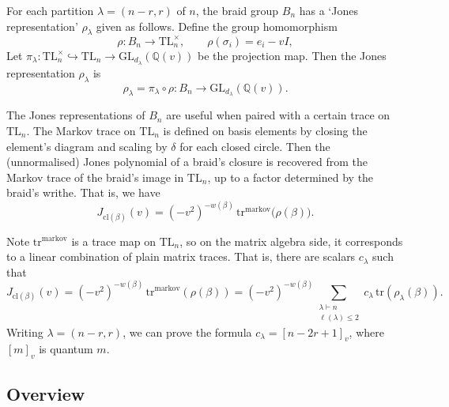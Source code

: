 ﻿\documentclass[10pt]{article}
\newcommand{\TL}{\mathrm{TL}}
\newcommand{\trm}{\mathrm{tr}^{\mathrm{markov}}}
\newcommand{\Tr}{\mathrm{tr}}
\newcommand{\cl}{\mathrm{cl}}
\newcommand{\qq}[1]{\left[#1\right]_v}
\begin{document}
For each partition $\lambda = (n-r,r)$ of $n$, the braid group $B_n$ has a `Jones representation' $\rho_\lambda$ given as follows. Define the group homomorphism 
\[
\rho: B_n\to\TL_n^\times,\qquad \rho(\sigma_i)=e_i-vI,
\] 
Let \(\pi_\lambda:\TL_n^\times\hookrightarrow\TL_n\to\mathrm{GL}_{d_\lambda}(\mathbb{Q}(v))\) be the projection map. Then the Jones representation $\rho_\lambda$ is 
\[
\rho_\lambda=\pi_\lambda\circ\rho:B_n\to\mathrm{GL}_{d_\lambda}(\mathbb{Q}(v)).
\]

The Jones representations of $B_n$ are useful when paired with a certain trace on $\TL_n$. 
The Markov trace on $\TL_n$ is defined on basis elements by closing the element's diagram 
and scaling by $\delta$ for each closed circle. 
Then the (unnormalised) Jones polynomial of a braid's closure is recovered from the
Markov trace of the braid's image in $\TL_n$, up to a factor determined by the braid's writhe. 
That is, we have
\[
J_{\cl(\beta)}(v)=(-v^2)^{-w(\beta)}\,\trm\bigl(\rho(\beta)\bigr).
\]

Note \(\trm\) is a trace map on $\TL_n$, so on the matrix algebra side, it corresponds to a linear combination 
of plain matrix traces. That is, there are scalars \(c_\lambda\) such that
\[
J_{\cl(\beta)}(v)
 =(-v^2)^{-w(\beta)}\,\trm(\rho(\beta))
 =(-v^2)^{-w(\beta)}\sum_{\substack{\lambda \vdash n \\ \ell(\lambda)\le 2}}  
c_\lambda\,\Tr(\rho_\lambda(\beta)).
\] 
Writing \(\lambda=(n-r,r)\), we can prove the formula $c_\lambda=\qq{n-2r+1}$, where $\qq{m}$ is quantum $m$. 






\newpage





\subsection*{Overview}
\end{document}

